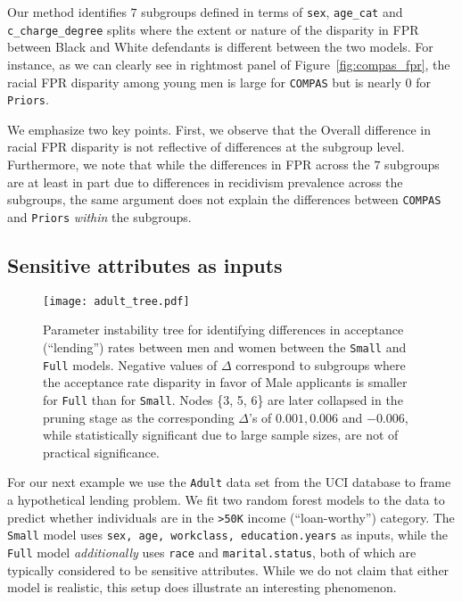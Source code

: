 \documentclass[11pt, sigconf, svgnames]{acmart}
\begin{document}
Our method identifies $7$ subgroups defined in terms of \verb|sex|, \verb|age_cat| and \verb|c_charge_degree| splits where the extent or nature of the disparity in FPR between Black and White defendants is different between the two models.  For instance, as we can clearly see in rightmost panel of Figure~\ref{fig:compas_fpr}, the racial FPR disparity among young men is large for \texttt{COMPAS} but is nearly $0$ for \texttt{Priors}.  

We emphasize two key points.  First, we observe that the Overall difference in racial FPR disparity is not reflective of differences at the subgroup level.  Furthermore, we note that while the differences in FPR across the $7$ subgroups are at least in part due to differences in recidivism prevalence across the subgroups, the same argument does not explain the differences between \texttt{COMPAS} and \texttt{Priors} \emph{within} the subgroups. 

\subsection{Sensitive attributes as inputs} \label{sec:adult}

\begin{figure}[t]
\texttt{[image: adult\_tree.pdf]}
\caption{Parameter instability tree for identifying differences in acceptance (``lending'') rates between men and women between the \texttt{Small} and \texttt{Full} models.  Negative values of $\Delta$ correspond to subgroups where the acceptance rate disparity in favor of Male applicants is smaller for \texttt{Full} than for \texttt{Small}. Nodes \{3, 5, 6\} are later collapsed in the pruning stage as the corresponding $\Delta$'s of $0.001, 0.006$ and $-0.006$, while statistically significant due to large sample sizes, are not of practical significance.}
\label{fig:adult_tree}
\end{figure}


For our next example we use the \texttt{Adult} data set from the UCI database \cite{Lichman:2013} to frame a hypothetical lending problem.  We fit two random forest models to the data to predict whether individuals are in the \verb|>50K| income (``loan-worthy'') category.  The \texttt{Small} model uses \verb|sex, age, workclass, education.years| as inputs, while the \texttt{Full} model \emph{additionally} uses \verb|race| and \verb|marital.status|, both of which are typically considered to be sensitive attributes.  While we do not claim that either model is realistic, this setup does illustrate an interesting phenomenon.  
\end{document}
